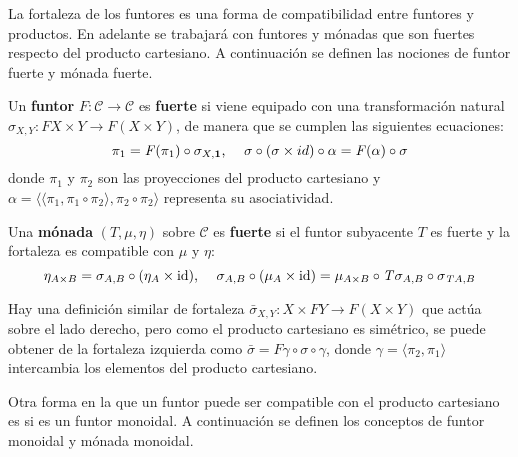 La fortaleza de los funtores es una forma de compatibilidad entre funtores y productos. En adelante se trabajará con funtores y mónadas que son fuertes respecto del producto cartesiano. A continuación se definen las nociones de funtor fuerte y mónada fuerte.

\begin{definition}
Un \textbf{funtor} $\mathit{F} : \mathscr{C} \rightarrow \mathscr{C}$  es \textbf{fuerte} si viene equipado con una transformación natural $\sigma_{X,Y} : \mathit{F}X \times Y \rightarrow \mathit{F} (X \times Y)$, de manera que se cumplen las siguientes ecuaciones:
\begin{equation*}
	\pi_1 = \mathit{F}(\pi_1) \circ \sigma_{X,\mathbf{1}} \text{, \quad} \sigma \circ (\sigma \times id) \circ \alpha = \mathit{F}(\alpha) \circ \sigma 
\end{equation*} 
donde $\pi_1$ y $\pi_2$ son las proyecciones del producto cartesiano y $\alpha = \langle \langle \pi_1 , \pi_1 \circ \pi_2 \rangle , \pi_2 \circ \pi_2 \rangle$ representa su asociatividad.
\end{definition}

\begin{definition}
Una \textbf{mónada} $(\mathit{T},\mu,\eta)$ sobre $\mathscr{C}$ es \textbf{fuerte} si el funtor subyacente $\mathit{T}$ es fuerte y la fortaleza es compatible con $\mu$ y $\eta$: 
\begin{equation*}
\eta_{A \times B} = \sigma_{A,B} \circ (\eta_A \times \text{id}) \text{, \quad} \sigma_{A,B} \circ (\mu_A \times \text{id}) = \mu_{A \times B} \circ \mathit{T}\sigma_{A,B} \circ \sigma_{\mathit{T}A,B}
\end{equation*}
\end{definition}

Hay una definición similar de fortaleza $\bar{\sigma}_{X,Y} : X \times \mathit{F}Y \rightarrow \mathit{F} (X \times Y)$ que actúa sobre el lado derecho, pero como el producto cartesiano es simétrico, se puede obtener de la fortaleza izquierda como $\bar{\sigma} = \mathit{F} \gamma \circ \sigma \circ \gamma$, donde $\gamma = \langle \pi_2 , \pi_1 \rangle$ intercambia los elementos del producto cartesiano.

Otra forma en la que un funtor puede ser compatible con el producto cartesiano es si es un funtor monoidal. A continuación se definen los conceptos de funtor monoidal y mónada monoidal.

